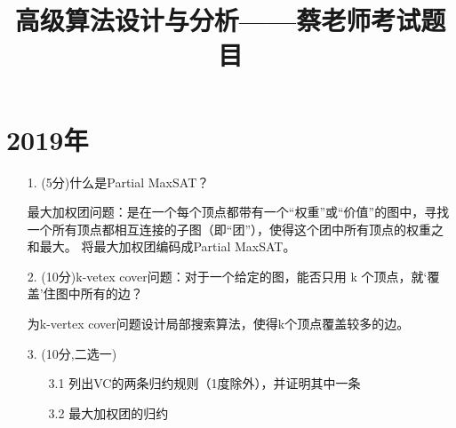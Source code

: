 \documentclass{article}
\title{高级算法设计与分析——蔡老师考试题目}
\author{}
\date{}
\begin{document}
\vspace{-9em}


\section*{2019年}
\begin{enumerate}
    \item[1. ](5分)什么是Partial MaxSAT？
    
    最大加权团问题：是在一个每个顶点都带有一个“权重”或“价值”的图中，寻找一个所有顶点都相互连接的子图（即“团”），使得这个团中所有顶点的权重之和最大。    将最大加权团编码成Partial MaxSAT。
    \vspace{10em}
    \item[2. ](10分)k-vetex cover问题：对于一个给定的图，能否只用 k 个顶点，就‘覆盖’住图中所有的边？
    
    为k-vertex cover问题设计局部搜索算法，使得k个顶点覆盖较多的边。
    \vspace{10em}
    \item[3. ](10分,二选一)
        \begin{enumerate}
            \item[3.1] 列出VC的两条归约规则（1度除外），并证明其中一条 
            \item[3.2] 最大加权团的归约
        \end{enumerate}
\end{enumerate}

\newpage
\end{document}

